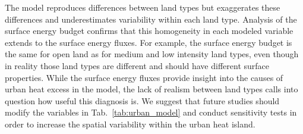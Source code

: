 \documentclass[draft,linenumbers]{agujournal}
\begin{document}
The model reproduces differences between land types but exaggerates these differences and underestimates variability within each land type. Analysis of the surface energy budget confirms that this homogeneity in each modeled variable extends to the surface energy fluxes.  
For example, the surface energy budget is the same for open land as for medium and low intensity land types, even though in reality those land types are different and should have different surface properties. While the surface energy fluxes provide insight into the causes of urban heat excess in the model, the lack of realism between land types calls into question how useful this diagnosis is. 
We suggest that future studies should modify the variables in Tab.~\ref{tab:urban_model} and conduct sensitivity tests in order to increase the spatial variability within the urban heat island.
\end{document}

